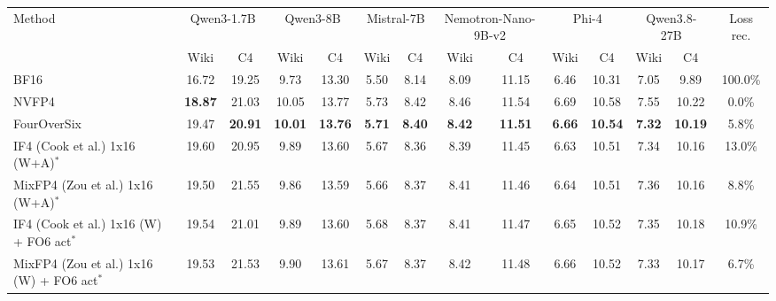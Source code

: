 \begin{tabular}{lccccccccccccc}
\toprule
Method & \multicolumn{2}{c}{Qwen3-1.7B} & \multicolumn{2}{c}{Qwen3-8B} & \multicolumn{2}{c}{Mistral-7B} & \multicolumn{2}{c}{Nemotron-Nano-9B-v2} & \multicolumn{2}{c}{Phi-4} & \multicolumn{2}{c}{Qwen3.8-27B} & Loss rec. \\
 & Wiki & C4 & Wiki & C4 & Wiki & C4 & Wiki & C4 & Wiki & C4 & Wiki & C4 & \\
\midrule
BF16 & 16.72 & 19.25 & 9.73 & 13.30 & 5.50 & 8.14 & 8.09 & 11.15 & 6.46 & 10.31 & 7.05 & 9.89 & 100.0\% \\
NVFP4 & \textbf{18.87} & 21.03 & 10.05 & 13.77 & 5.73 & 8.42 & 8.46 & 11.54 & 6.69 & 10.58 & 7.55 & 10.22 & 0.0\% \\
FourOverSix & 19.47 & \textbf{20.91} & \textbf{10.01} & \textbf{13.76} & \textbf{5.71} & \textbf{8.40} & \textbf{8.42} & \textbf{11.51} & \textbf{6.66} & \textbf{10.54} & \textbf{7.32} & \textbf{10.19} & 5.8\% \\
\midrule
IF4 (Cook et al.) 1x16 (W+A)$^\ast$ & 19.60 & 20.95 & 9.89 & 13.60 & 5.67 & 8.36 & 8.39 & 11.45 & 6.63 & 10.51 & 7.34 & 10.16 & 13.0\% \\
MixFP4 (Zou et al.) 1x16 (W+A)$^\ast$ & 19.50 & 21.55 & 9.86 & 13.59 & 5.66 & 8.37 & 8.41 & 11.46 & 6.64 & 10.51 & 7.36 & 10.16 & 8.8\% \\
IF4 (Cook et al.) 1x16 (W) + FO6 act$^\ast$ & 19.54 & 21.01 & 9.89 & 13.60 & 5.68 & 8.37 & 8.41 & 11.47 & 6.65 & 10.52 & 7.35 & 10.18 & 10.9\% \\
MixFP4 (Zou et al.) 1x16 (W) + FO6 act$^\ast$ & 19.53 & 21.53 & 9.90 & 13.61 & 5.67 & 8.37 & 8.42 & 11.48 & 6.66 & 10.52 & 7.33 & 10.17 & 6.7\% \\
\bottomrule
\end{tabular}
